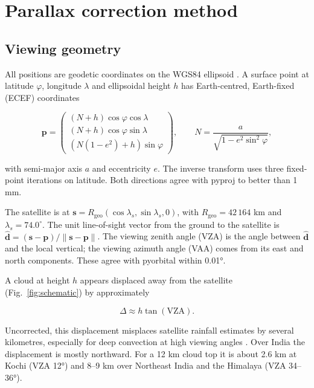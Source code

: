 \section{Parallax correction method}
\label{sec:method}
\label{sec:3}

\subsection{Viewing geometry}\label{sec:3.1}

All positions are geodetic coordinates on the WGS84 ellipsoid \citep{nima2000}. A surface point at latitude \(\varphi\), longitude \(\lambda\) and ellipsoidal height \(h\) has Earth-centred, Earth-fixed (ECEF) coordinates

\[
\mathbf{p} = \begin{pmatrix} (N + h)\cos\varphi\cos\lambda \\ (N + h)\cos\varphi\sin\lambda \\ \left(N(1 - e^2) + h\right)\sin\varphi \end{pmatrix},
\qquad N = \frac{a}{\sqrt{1 - e^2\sin^2\varphi}},
\]

with semi-major axis \(a\) and eccentricity \(e\). The inverse transform uses three fixed-point iterations on latitude. Both directions agree with pyproj \citep{pyproj} to better than 1 mm.

The satellite is at \(\mathbf{s} = R_{\mathrm{geo}}(\cos\lambda_s, \sin\lambda_s, 0)\), with \(R_{\mathrm{geo}} = 42\,164\) km and \(\lambda_s = 74.0^\circ\). The unit line-of-sight vector from the ground to the satellite is \(\hat{\mathbf{d}} = (\mathbf{s} - \mathbf{p})/\lVert\mathbf{s} - \mathbf{p}\rVert\). The viewing zenith angle (VZA) is the angle between \(\hat{\mathbf{d}}\) and the local vertical; the viewing azimuth angle (VAA) comes from its east and north components. These agree with pyorbital \citep{raspaud2018} within 0.01°.

A cloud at height \(h\) appears displaced away from the satellite (Fig.~\ref{fig:schematic}) by approximately

\[
\Delta \approx h \tan(\mathrm{VZA}).
\]

Uncorrected, this displacement misplaces satellite rainfall estimates by several kilometres, especially for deep convection at high viewing angles \citep{vicente2002}. Over India the displacement is mostly northward. For a 12 km cloud top it is about 2.6 km at Kochi (VZA 12°) and 8--9 km over Northeast India and the Himalaya (VZA 34--36°).

